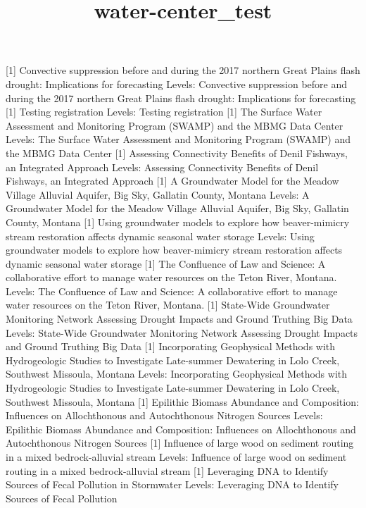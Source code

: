 \documentclass[]{article}
\title{water-center\_test}
\author{}
\date{}
\begin{document}
\maketitle

{[}1{]} Convective suppression before and during the 2017 northern Great
Plains flash drought: Implications for forecasting Levels: Convective
suppression before and during the 2017 northern Great Plains flash
drought: Implications for forecasting {[}1{]} Testing registration
Levels: Testing registration {[}1{]} The Surface Water Assessment and
Monitoring Program (SWAMP) and the MBMG Data Center Levels: The Surface
Water Assessment and Monitoring Program (SWAMP) and the MBMG Data Center
{[}1{]} Assessing Connectivity Benefits of Denil Fishways, an Integrated
Approach Levels: Assessing Connectivity Benefits of Denil Fishways, an
Integrated Approach {[}1{]} A Groundwater Model for the Meadow Village
Alluvial Aquifer, Big Sky, Gallatin County, Montana Levels: A
Groundwater Model for the Meadow Village Alluvial Aquifer, Big Sky,
Gallatin County, Montana {[}1{]} Using groundwater models to explore how
beaver-mimicry stream restoration affects dynamic seasonal water storage
Levels: Using groundwater models to explore how beaver-mimicry stream
restoration affects dynamic seasonal water storage {[}1{]} The
Confluence of Law and Science: A collaborative effort to manage water
resources on the Teton River, Montana. Levels: The Confluence of Law and
Science: A collaborative effort to manage water resources on the Teton
River, Montana. {[}1{]} State-Wide Groundwater Monitoring Network
\xdb{} Assessing Drought Impacts and Ground Truthing Big Data
Levels: State-Wide Groundwater Monitoring Network \xdb{} Assessing
Drought Impacts and Ground Truthing Big Data {[}1{]} Incorporating
Geophysical Methods with Hydrogeologic Studies to Investigate
Late-summer Dewatering in Lolo Creek, Southwest Missoula, Montana
Levels: Incorporating Geophysical Methods with Hydrogeologic Studies to
Investigate Late-summer Dewatering in Lolo Creek, Southwest Missoula,
Montana {[}1{]} Epilithic Biomass Abundance and Composition: Influences
on Allochthonous and Autochthonous Nitrogen Sources Levels: Epilithic
Biomass Abundance and Composition: Influences on Allochthonous and
Autochthonous Nitrogen Sources {[}1{]} Influence of large wood on
sediment routing in a mixed bedrock-alluvial stream Levels: Influence of
large wood on sediment routing in a mixed bedrock-alluvial stream
{[}1{]} Leveraging DNA to Identify Sources of Fecal Pollution in
Stormwater Levels: Leveraging DNA to Identify Sources of Fecal Pollution
\end{document}
